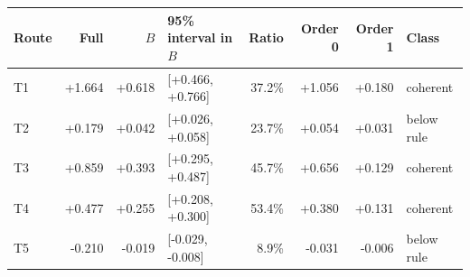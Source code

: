 \begin{tabular}{@{}lrrlrrrl@{}}
\toprule
Route & Full & $B$ & 95\% interval in $B$ & Ratio & Order 0 & Order 1 & Class \\
\midrule
T1 & +1.664 & +0.618 & [+0.466, +0.766] & 37.2\% & +1.056 & +0.180 & coherent \\
T2 & +0.179 & +0.042 & [+0.026, +0.058] & 23.7\% & +0.054 & +0.031 & below rule \\
T3 & +0.859 & +0.393 & [+0.295, +0.487] & 45.7\% & +0.656 & +0.129 & coherent \\
T4 & +0.477 & +0.255 & [+0.208, +0.300] & 53.4\% & +0.380 & +0.131 & coherent \\
T5 & -0.210 & -0.019 & [-0.029, -0.008] & 8.9\% & -0.031 & -0.006 & below rule \\
\bottomrule
\end{tabular}
